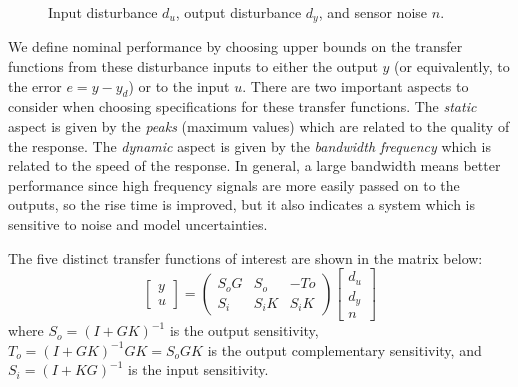 \documentclass[12pt,lot, lof]{puthesis}
\begin{document}
\begin{figure}[htbp]
	\centering
	\caption{Input disturbance $d_u$, output disturbance $d_y$, and sensor noise $n$.}
	\label{fig:example_disturbances}
\end{figure}

We define nominal performance by choosing upper bounds on the transfer functions from these disturbance inputs to either the output $y$ (or equivalently, to the error $e = y - y_d$) or to the input $u$.
There are two important aspects to consider when choosing specifications for these transfer functions.
The \emph{static} aspect is given by the \emph{peaks} (maximum values) which are related to the quality of the response.
The \emph{dynamic} aspect is given by the \emph{bandwidth frequency} which is related to the speed of the response.
In general, a large bandwidth means better performance since high frequency signals are more easily passed on to the outputs, so the rise time is improved, but it also indicates a system which is sensitive to noise and model uncertainties.

The five distinct transfer functions of interest are shown in the matrix below:
\begin{equation}
	\renewcommand\arraystretch{0.8}
	\begin{bmatrix} y \\ u \end{bmatrix} =
	\begin{pmatrix} S_o G & S_o & -To \\ S_i & S_i K & S_i K \end{pmatrix}
	\begin{bmatrix} d_u \\ d_y \\ n \end{bmatrix}
\end{equation}
where $S_o = (I + G K)^{-1}$ is the output sensitivity, $T_o = (I + G K)^{-1} G K = S_o G K$ is the output complementary sensitivity, and $S_i = (I + K G)^{-1}$ is the input sensitivity.
\end{document}
